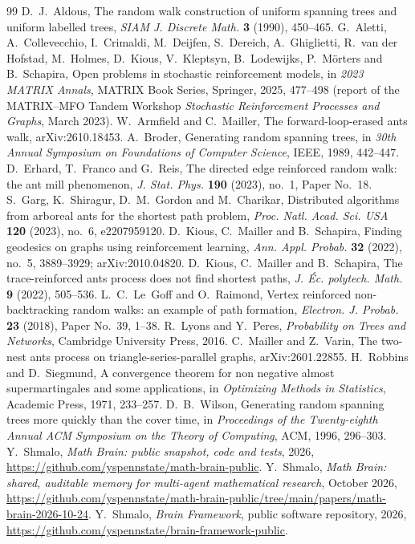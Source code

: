 \documentclass[11pt]{amsart}
\theoremstyle{remark}
\begin{document}
\begin{thebibliography}{99}
 D.~J.~Aldous, The random walk construction of uniform spanning trees and uniform labelled trees,
\emph{SIAM J. Discrete Math.} \textbf{3} (1990), 450--465.
 G.~Aletti, A.~Collevecchio, I.~Crimaldi, M.~Deijfen, S.~Dereich, A.~Ghiglietti, R.~van der Hofstad,
M.~Holmes, D.~Kious, V.~Kleptsyn, B.~Lodewijks, P.~M\"orters and B.~Schapira, Open problems in stochastic
reinforcement models, in \emph{2023 MATRIX Annals}, MATRIX Book Series, Springer, 2025, 477--498 (report of the
MATRIX--MFO Tandem Workshop \emph{Stochastic Reinforcement Processes and Graphs}, March 2023).
 W.~Armfield and C.~Mailler, The forward-loop-erased ants walk, arXiv:2610.18453.
 A.~Broder, Generating random spanning trees, in \emph{30th Annual Symposium on Foundations of Computer
Science}, IEEE, 1989, 442--447.
 D.~Erhard, T.~Franco and G.~Reis, The directed edge reinforced random walk: the ant mill phenomenon,
\emph{J. Stat. Phys.} \textbf{190} (2023), no.~1, Paper No.~18.
 S.~Garg, K.~Shiragur, D.~M.~Gordon and M.~Charikar, Distributed algorithms from arboreal ants for the
shortest path problem, \emph{Proc. Natl. Acad. Sci. USA} \textbf{120} (2023), no.~6, e2207959120.
 D.~Kious, C.~Mailler and B.~Schapira, Finding geodesics on graphs using reinforcement learning,
\emph{Ann. Appl. Probab.} \textbf{32} (2022), no.~5, 3889--3929; arXiv:2010.04820.
 D.~Kious, C.~Mailler and B.~Schapira, The trace-reinforced ants process does not find shortest paths,
\emph{J. \'Ec. polytech. Math.} \textbf{9} (2022), 505--536.
 L.~C.~Le~Goff and O.~Raimond, Vertex reinforced non-backtracking random walks: an example of path
formation, \emph{Electron. J. Probab.} \textbf{23} (2018), Paper No.~39, 1--38.
 R.~Lyons and Y.~Peres, \emph{Probability on Trees and Networks}, Cambridge University Press, 2016.
 C.~Mailler and Z.~Varin, The two-nest ants process on triangle-series-parallel graphs,
arXiv:2601.22855.
 H.~Robbins and D.~Siegmund, A convergence theorem for non negative almost supermartingales and some
applications, in \emph{Optimizing Methods in Statistics}, Academic Press, 1971, 233--257.
 D.~B.~Wilson, Generating random spanning trees more quickly than the cover time, in \emph{Proceedings
of the Twenty-eighth Annual ACM Symposium on the Theory of Computing}, ACM, 1996, 296--303.
 Y.~Shmalo, \emph{Math Brain: public snapshot, code and tests}, 2026,
\url{https://github.com/yspennstate/math-brain-public}.
 Y.~Shmalo, \emph{Math Brain: shared, auditable memory for multi-agent mathematical research},
October 2026, \url{https://github.com/yspennstate/math-brain-public/tree/main/papers/math-brain-2026-10-24}.
 Y.~Shmalo, \emph{Brain Framework}, public software repository, 2026,
\url{https://github.com/yspennstate/brain-framework-public}.
\end{thebibliography}
\end{document}
